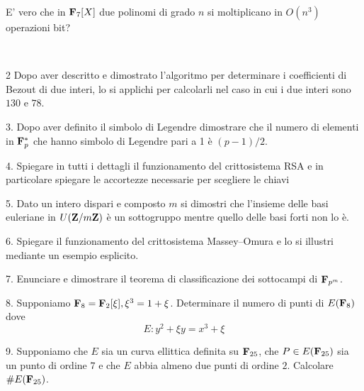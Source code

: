 E' vero che in ${\bf F}_7[X]$ due polinomi di grado $n$ si moltiplicano in $O(n^3)$ operazioni bit?\medskip\bigskip\bigskip

\ \dotfill\ \bigskip\bigskip\bigskip\vfil\eject

\item{2} Dopo aver descritto e dimostrato l'algoritmo per determinare i coefficienti di Bezout di due interi, lo si applichi per
calcolarli nel caso in cui i due interi sono $130$ e $78$.\vv

\item{3.} Dopo aver definito il simbolo di Legendre dimostrare che il numero di elementi in ${\bf F}_p^*$ che
hanno simbolo di Legendre pari a 1 \`e $(p-1)/2$. \vv

\item{4.} Spiegare in tutti i dettagli il funzionamento del crittosistema RSA e in particolare spiegare le accortezze
necessarie per scegliere le chiavi\ve\ \vs

\item{5.} Dato un intero dispari e composto $m$ si dimostri che l'insieme delle basi euleriane in $U({\bf Z}/m{\bf Z})$ \`e
un sottogruppo mentre quello delle basi forti non lo \`e.\vv

\item{6.} Spiegare il funzionamento del crittosistema Massey--Omura e lo si illustri mediante un esempio esplicito.\vv

\item{7.} Enunciare e dimostrare il teorema di classificazione dei sottocampi di ${\bf F}_{p^m}$.\ve\ \vs

\item{8.} Supponiamo ${\bf F}_8={\bf F}_2[\xi], \xi^3=1+\xi$. 
Determinare il numero di punti di $E({\bf F}_8)$ dove 
$$E: y^2+\xi y=x^3+\xi$$\vv

\item{9.} Supponiamo che $E$ sia un curva ellittica definita su ${\bf F}_{25}$, che $P\in E({\bf F}_{25})$ sia un punto di
ordine $7$ e che $E$ abbia almeno due punti di ordine $2$. Calcolare $\#E({\bf F}_{25})$.\ \vst\bye
